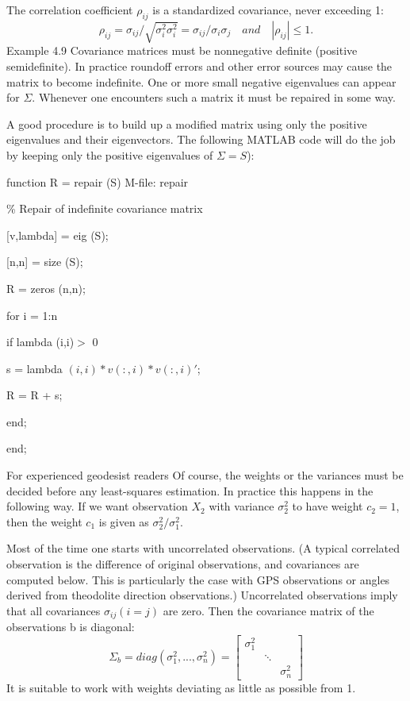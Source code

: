 	The correlation coefficient $\rho_{ij}$ is a standardized covariance, never exceeding 1:
	\begin{equation} 
	\rho_{ij}=\sigma_{ij}/\sqrt{\sigma^2_i\sigma^2_i}=\sigma_{ij}/\sigma_i\sigma_j 
	\quad and \quad
	|\rho_{ij}|\leq 1.
	\end{equation}
	Example 4.9 Covariance matrices must be nonnegative definite (positive semidefinite). In
	practice roundoff errors and other error sources may cause the matrix to become indefinite.
	One or more small negative eigenvalues can appear for $\Sigma$. Whenever one encounters such
	a matrix it must be repaired in some way.
	
	A good procedure is to build up a modified matrix using only the positive eigenvalues
	and their eigenvectors. The following MATLAB code will do the job by keeping only the
	positive eigenvalues of $\Sigma = S$):
	
	function R = repair (S) \qquad \qquad \qquad \qquad \qquad  M-file: repair
	
	\% Repair of indefinite covariance matrix
	
	[v,lambda] = eig (S);
	
	[n,n] = size (S);

	R = zeros (n,n);
	
	for i = 1:n
	
	\quad if lambda (i,i)$>$ 0
	
	\quad s = lambda $(i,i)\ast v(:,i)\ast v(:,i)'$;
	
	\quad R = R + s;
	
	\quad end;
	
	end;
	
	For experienced geodesist readers Of course, the weights or the variances must be decided
	before any least-squares estimation. In practice this happens in the following way. If we
	want observation $X_2$ with variance $\sigma^2_2$ to have weight $c_2=1$, then the weight $c_1$ is given as $\sigma^2_2/\sigma^2_1$.
	
	Most of the time one starts with uncorrelated observations. (A typical correlated observation is the difference of original observations, and covariances are computed below.
	This is particularly the case with GPS observations or angles derived from theodolite direction observations.) Uncorrelated observations imply that all covariances $\sigma_{ij}(i=j)$ are zero. Then the covariance matrix of the observations b is diagonal:
	\begin{equation}
	\Sigma_b=diag(\sigma^2_1,...,\sigma^2_n)=
	\begin{bmatrix}
	\sigma^2_1 & & \\
	 & \ddots & \\
	  & & \sigma^2_n
	\end{bmatrix}
	\end{equation} 
	It is suitable to work with weights deviating as little as possible from 1.
	
	
